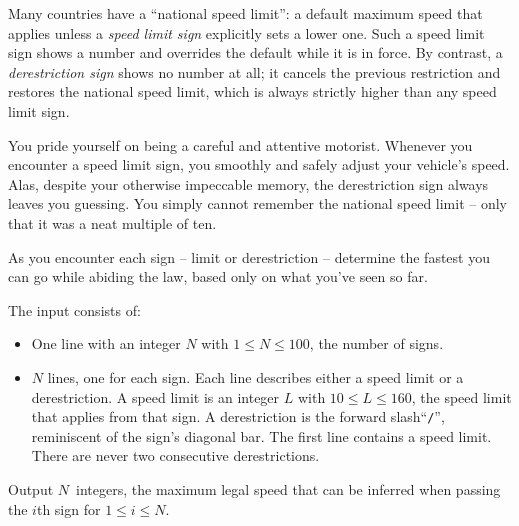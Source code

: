 


Many countries have a “national speed limit”: 
a default maximum speed that applies unless a \emph{speed limit sign} explicitly sets a lower one.
Such a speed limit sign shows a number and overrides the default while it is in force.
By contrast, a \emph{derestriction sign} shows no number at all; it cancels the previous restriction and restores the national speed limit, which is always strictly higher than any speed limit sign.

You pride yourself on being a careful and attentive motorist.
Whenever you encounter a speed limit sign, you smoothly and safely adjust your vehicle's speed.
Alas, despite your otherwise impeccable memory, the derestriction sign always leaves you guessing.
You simply cannot remember the national speed limit -- only that it was a neat multiple of ten.

As you encounter each sign -- limit or derestriction -- determine the fastest you can go while abiding the law, based only on what you've seen so far.


\begin{Input}
    The input consists of:
    \begin{itemize}
        \item One line with an integer $N$ with $1\leq N\leq 100$, the number of signs.
        \item $N$ lines, one for each sign. 
	  Each line describes either a speed limit or a derestriction.
	  A speed limit  is an integer $L$  with $10\leq L\leq 160$, the speed limit that applies from that sign.
	  A derestriction is the forward slash``\texttt{/}'', reminiscent of the sign's diagonal bar.
	  The first line contains a speed limit.
	  There are never two consecutive derestrictions.
    \end{itemize}
\end{Input}

\begin{Output}
  Output $N$~integers, the maximum legal speed that can be inferred when passing the $i$th sign for $1\leq i\leq N$.
\end{Output}
